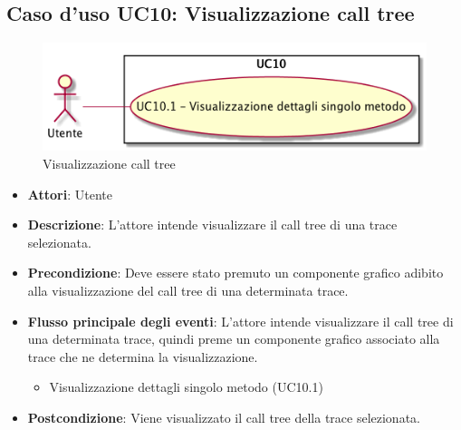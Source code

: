 \subsection{Caso d'uso UC10: Visualizzazione call tree}
\begin{figure} [H]
	\centering
	\includegraphics[scale=0.45]{./UC/UC10.png}
	\caption{Visualizzazione call tree}\label{}
\end{figure}
\begin{itemize}
	\item \textbf{Attori}: Utente
	\item \textbf{Descrizione}: L'attore intende visualizzare il call tree di una trace selezionata.
	\item \textbf{Precondizione}: Deve essere stato premuto un componente grafico adibito alla visualizzazione del call tree di una determinata trace.
	\item \textbf{Flusso principale degli eventi}: L'attore intende visualizzare il call tree di una determinata trace, quindi preme un componente grafico associato alla trace che ne determina la visualizzazione.
	\begin{itemize}
		\item Visualizzazione dettagli singolo metodo (UC10.1)
	\end{itemize}
	\item \textbf{Postcondizione}: Viene visualizzato il call tree della trace selezionata.
\end{itemize}
